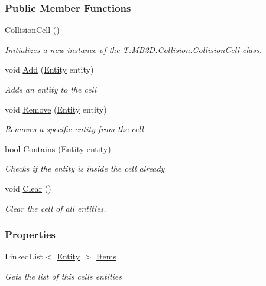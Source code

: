 \subsubsection*{Public Member Functions}
\begin{DoxyCompactItemize}
\item 
\hyperlink{class_m_b2_d_1_1_collision_1_1_collision_cell_a2eefdbb1f60eb35c38c45b4a0f4d939d}{Collision\+Cell} ()
\begin{DoxyCompactList}\small\item\em Initializes a new instance of the T\+:\+M\+B2\+D.\+Collision.\+Collision\+Cell class. \end{DoxyCompactList}\item 
void \hyperlink{class_m_b2_d_1_1_collision_1_1_collision_cell_a4fc338d7dbfd7418f5493424c5937213}{Add} (\hyperlink{class_m_b2_d_1_1_entity_component_1_1_entity}{Entity} entity)
\begin{DoxyCompactList}\small\item\em Adds an entity to the cell \end{DoxyCompactList}\item 
void \hyperlink{class_m_b2_d_1_1_collision_1_1_collision_cell_a064f540f907885b4224119308cbf1761}{Remove} (\hyperlink{class_m_b2_d_1_1_entity_component_1_1_entity}{Entity} entity)
\begin{DoxyCompactList}\small\item\em Removes a specific entity from the cell \end{DoxyCompactList}\item 
bool \hyperlink{class_m_b2_d_1_1_collision_1_1_collision_cell_aa4be244387541ee24d88da80331b3438}{Contains} (\hyperlink{class_m_b2_d_1_1_entity_component_1_1_entity}{Entity} entity)
\begin{DoxyCompactList}\small\item\em Checks if the entity is inside the cell already \end{DoxyCompactList}\item 
void \hyperlink{class_m_b2_d_1_1_collision_1_1_collision_cell_ae4ff144f6c768003d8be46e17e130646}{Clear} ()
\begin{DoxyCompactList}\small\item\em Clear the cell of all entities. \end{DoxyCompactList}\end{DoxyCompactItemize}
\subsubsection*{Properties}
\begin{DoxyCompactItemize}
\item 
Linked\+List$<$ \hyperlink{class_m_b2_d_1_1_entity_component_1_1_entity}{Entity} $>$ \hyperlink{class_m_b2_d_1_1_collision_1_1_collision_cell_ab893dad8ce4d09c5ab38a5da93145755}{Items}
\begin{DoxyCompactList}\small\item\em Gets the list of this cells entities \end{DoxyCompactList}\end{DoxyCompactItemize}


